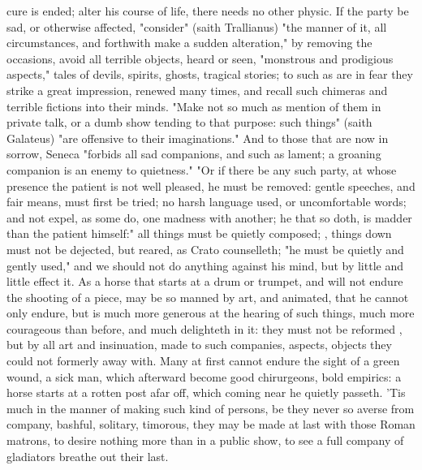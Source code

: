 {cure is ended; alter his course of life, there needs no other physic. If the party be sad, or otherwise affected, "consider" (saith Trallianus) "the manner of it, all circumstances, and forthwith make a sudden alteration," by removing the occasions, avoid all terrible objects, heard or seen, "monstrous and prodigious aspects," tales of devils, spirits, ghosts, tragical stories; to such as are in fear they strike a great impression, renewed many times, and recall such chimeras and terrible fictions into their minds. "Make not so much as mention of them in private talk, or a dumb show tending to that purpose: such things" (saith Galateus) "are offensive to their imaginations." And to those that are now in sorrow, Seneca "forbids all sad companions, and such as lament; a groaning companion is an enemy to quietness." "Or if there be any such party, at whose presence the patient is not well pleased, he must be removed: gentle speeches, and fair means, must first be tried; no harsh language used, or uncomfortable words; and not expel, as some do, one madness with another; he that so doth, is madder than the patient himself:" all things must be quietly composed; , things down must not be dejected, but reared, as Crato counselleth; "he must be quietly and gently used," and we should not do anything against his mind, but by little and little effect it. As a horse that starts at a drum or trumpet, and will not endure the shooting of a piece, may be so manned by art, and animated, that he cannot only endure, but is much more generous at the hearing of such things, much more courageous than before, and much delighteth in it: they must not be reformed , but by all art and insinuation, made to such companies, aspects, objects they could not formerly away with. Many at first cannot endure the sight of a green wound, a sick man, which afterward become good chirurgeons, bold empirics: a horse starts at a rotten post afar off, which coming near he quietly passeth. 'Tis much in the manner of making such kind of persons, be they never so averse from company, bashful, solitary, timorous, they may be made at last with those Roman matrons, to desire nothing more than in a public show, to see a full company of gladiators breathe out their last.

}
